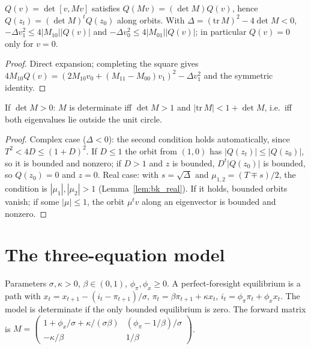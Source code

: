 \begin{lemma}
\label{lem:bk_complex}
\leanok
{}
$Q(v) = \det[v, Mv]$ satisfies $Q(Mv) = (\det M)Q(v)$, hence $Q(z_t) = (\det M)^tQ(z_0)$ along orbits. With
$\Delta = (\mathrm{tr}\,M)^2 - 4\det M < 0$, $-\Delta v_1^2 \le 4|M_{10}||Q(v)|$ and $-\Delta v_0^2 \le 4|M_{01}||Q(v)|$; in
particular $Q(v) = 0$ only for $v = 0$.
\end{lemma}
\begin{proof}
\leanok
Direct expansion; completing the square gives $4M_{10}Q(v) = (2M_{10}v_0 + (M_{11} - M_{00})v_1)^2 - \Delta v_1^2$ and
the symmetric identity.
\end{proof}

\begin{theorem}
\label{thm:bk}
\leanok
{}
If $\det M > 0$: $M$ is determinate iff $\det M > 1$ and $|\mathrm{tr}\,M| < 1 + \det M$, i.e.\ iff both eigenvalues
lie outside the unit circle.
\end{theorem}
\begin{proof}
\leanok
Complex case ($\Delta < 0$): the second condition holds automatically, since $T^2 < 4D \le (1 + D)^2$. If
$D \le 1$ the orbit from $(1,0)$ has $|Q(z_t)| \le |Q(z_0)|$, so it is bounded and nonzero; if $D > 1$ and $z$ is
bounded, $D^t|Q(z_0)|$ is bounded, so $Q(z_0) = 0$ and $z = 0$. Real case: with $s = \sqrt\Delta$ and
$\mu_{1,2} = (T \mp s)/2$, the condition is $|\mu_1|, |\mu_2| > 1$ (Lemma~\ref{lem:bk_real}). If it holds, bounded
orbits vanish; if some $|\mu| \le 1$, the orbit $\mu^tv$ along an eigenvector is bounded and nonzero.
\end{proof}

\section{The three-equation model}
\label{sec:nk3}

\begin{definition}
\label{def:nk_model}
\leanok
{}
Parameters $\sigma, \kappa > 0$, $\beta \in (0,1)$, $\phi_\pi, \phi_x \ge 0$. A perfect-foresight equilibrium is a path
with $x_t = x_{t+1} - (i_t - \pi_{t+1})/\sigma$, $\pi_t = \beta\pi_{t+1} + \kappa x_t$, $i_t = \phi_\pi\pi_t + \phi_xx_t$.
The model is determinate if the only bounded equilibrium is zero. The forward matrix is
$M = \begin{pmatrix}1 + \phi_x/\sigma + \kappa/(\sigma\beta) & (\phi_\pi - 1/\beta)/\sigma\\ -\kappa/\beta & 1/\beta\end{pmatrix}$.
\end{definition}

